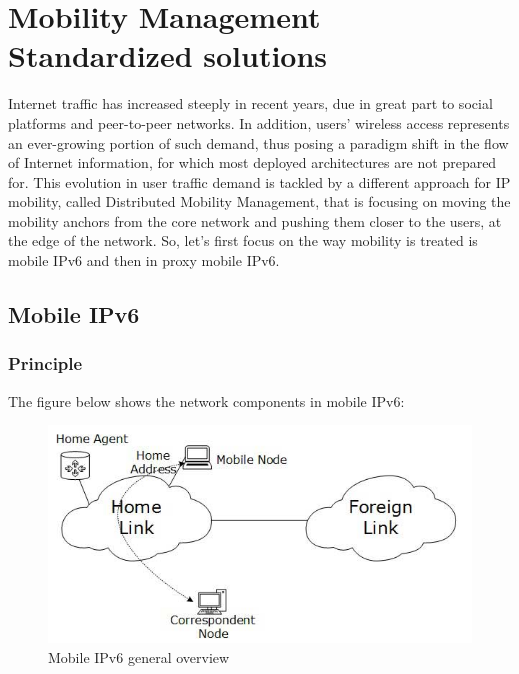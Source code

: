 \documentclass{article}
\begin{document}
\newpage
\section{Mobility Management Standardized solutions}

Internet traffic has increased steeply in recent years, due in great
part to social platforms and peer-to-peer networks. In addition,
users' wireless access represents an ever-growing portion of such
demand, thus posing a paradigm shift in the flow of Internet
information, for which most deployed architectures are not prepared
for. This evolution in user traffic demand is tackled by a different
approach for IP mobility, called Distributed Mobility Management, that
is focusing on moving the mobility anchors from the core network and
pushing them closer to the users, at the edge of the network. So,
let's first focus on the way mobility is treated is mobile IPv6 and
then in proxy mobile IPv6.

\subsection{Mobile IPv6}

\subsubsection{Principle}

The figure below shows the  network components in mobile IPv6: 

\begin{figure}[h!]
  \centering
    \includegraphics[scale=0.5]{reportPictures/figure1.png}
  \caption{Mobile IPv6 general overview}
\end{figure}
\end{document}
